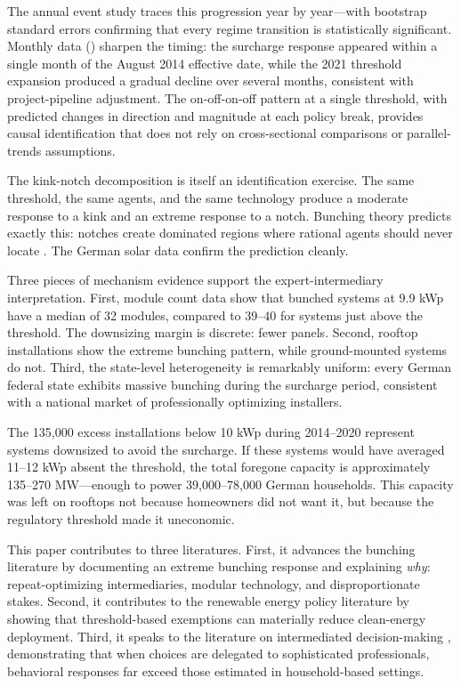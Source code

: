 \documentclass[12pt]{article}
\begin{document}
The annual event study traces this progression year by year---with bootstrap standard errors confirming that every regime transition is statistically significant. Monthly data () sharpen the timing: the surcharge response appeared within a single month of the August 2014 effective date, while the 2021 threshold expansion produced a gradual decline over several months, consistent with project-pipeline adjustment. The on-off-on-off pattern at a single threshold, with predicted changes in direction and magnitude at each policy break, provides causal identification that does not rely on cross-sectional comparisons or parallel-trends assumptions.

The kink-notch decomposition is itself an identification exercise. The same threshold, the same agents, and the same technology produce a moderate response to a kink and an extreme response to a notch. Bunching theory predicts exactly this: notches create dominated regions where rational agents should never locate \citep{kleven2016bunching}. The German solar data confirm the prediction cleanly.

Three pieces of mechanism evidence support the expert-intermediary interpretation. First, module count data show that bunched systems at 9.9 kWp have a median of 32 modules, compared to 39--40 for systems just above the threshold. The downsizing margin is discrete: fewer panels. Second, rooftop installations show the extreme bunching pattern, while ground-mounted systems do not. Third, the state-level heterogeneity is remarkably uniform: every German federal state exhibits massive bunching during the surcharge period, consistent with a national market of professionally optimizing installers.

The 135,000 excess installations below 10 kWp during 2014--2020 represent systems downsized to avoid the surcharge. If these systems would have averaged 11--12 kWp absent the threshold, the total foregone capacity is approximately 135--270 MW---enough to power 39,000--78,000 German households. This capacity was left on rooftops not because homeowners did not want it, but because the regulatory threshold made it uneconomic.

This paper contributes to three literatures. First, it advances the bunching literature \citep{saez2010taxpayers, kleven2013using} by documenting an extreme bunching response and explaining \textit{why}: repeat-optimizing intermediaries, modular technology, and disproportionate stakes. Second, it contributes to the renewable energy policy literature \citep{borenstein2012private, hughes2015policy} by showing that threshold-based exemptions can materially reduce clean-energy deployment. Third, it speaks to the literature on intermediated decision-making \citep{chetty2011adjustment}, demonstrating that when choices are delegated to sophisticated professionals, behavioral responses far exceed those estimated in household-based settings.
\end{document}
